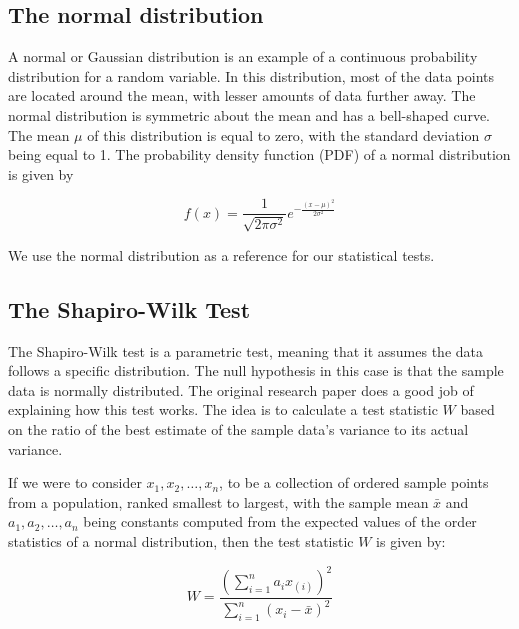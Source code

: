 \documentclass[12pt]{article}
\begin{document}
\subsection{The normal distribution}\label{NormalDistribution}

A normal or Gaussian distribution is an example of a continuous probability distribution for a random variable. In this distribution, most of the data points are located around the mean, with lesser amounts of data further away. The normal distribution is symmetric about the mean and has a bell-shaped curve. The mean $\mu$ of this distribution is equal to zero, with the standard deviation $\sigma$ being equal to 1. The probability density function (PDF) of a normal distribution is given by

\begin{equation}
    f(x) = \frac{1}{\sqrt{2 \pi \sigma^2}} e^{-\frac{(x - \mu)^2}{2 \sigma^2}}
    \label{eq:normal_distribution}
\end{equation}

\medskip
\noindent We use the normal distribution as a reference for our statistical tests.


\subsection{The Shapiro-Wilk Test}\label{ShapiroWilk}

The Shapiro-Wilk test is a parametric test, meaning that it assumes the data follows a specific distribution. The null hypothesis in this case is that the sample data is normally distributed. The original research paper \cite{Shapiro1965} does a good job of explaining how this test works. The idea is to calculate a test statistic $W$ based on the ratio of the best estimate of the sample data's variance to its actual variance.

\medskip
\noindent If we were to consider $x_1, x_2, \ldots, x_n$, to be a collection of ordered sample points from a population, ranked smallest to largest, with the sample mean $\bar{x}$ and $a_1, a_2, \ldots, a_n$ being constants computed from the expected values of the order statistics of a normal distribution, then the test statistic $W$ is given by:

\begin{equation}
    W = \frac{(\sum\limits_{i=1}^{n} a_i x_{(i)})^2}{\sum\limits_{i=1}^{n} (x_i - \bar{x})^2}
    \label{eq:shapiro_wilk_statistic}
\end{equation}
\end{document}
